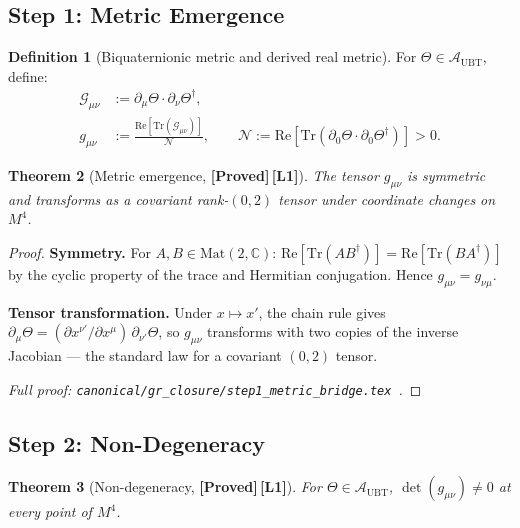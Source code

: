 \documentclass[12pt,a4paper]{article}
\newtheorem{theorem}{Theorem}[section]
\theoremstyle{definition}
\newtheorem{definition}[theorem]{Definition}
\theoremstyle{remark}
\newcommand{\PROVED}{\textbf{[Proved]}}
\newcommand{\Lone}{\textbf{[L1]}}
\newcommand{\CC}{\mathbb{C}}
\newcommand{\Tr}{\mathrm{Tr}}
\newcommand{\re}{\mathrm{Re}}
\newcommand{\calA}{\mathcal{A}}
\newcommand{\calG}{\mathcal{G}}
\newcommand{\calN}{\mathcal{N}}
\begin{document}
\subsection{Step 1: Metric Emergence}
\label{sec:step1}

\begin{definition}[Biquaternionic metric and derived real metric]
\label{def:metric}
For $\Theta \in \calA_{\mathrm{UBT}}$, define:
\begin{align}
  \calG_{\mu\nu} &:= \partial_\mu\Theta \cdot \partial_\nu\Theta^\dagger, \\
  g_{\mu\nu} &:= \frac{\re[\Tr(\calG_{\mu\nu})]}{\calN},
  \qquad
  \calN := \re[\Tr(\partial_0\Theta \cdot \partial_0\Theta^\dagger)] > 0.
\end{align}
\end{definition}

\begin{theorem}[Metric emergence, \PROVED\,\Lone]
\label{thm:metric}
The tensor $g_{\mu\nu}$ is symmetric and transforms as a covariant
rank-$(0,2)$ tensor under coordinate changes on $M^4$.
\end{theorem}

\begin{proof}
\textbf{Symmetry.}
For $A,B \in \mathrm{Mat}(2,\CC)$:
$\re[\Tr(AB^\dagger)] = \re[\Tr(BA^\dagger)]$
by the cyclic property of the trace and Hermitian conjugation.
Hence $g_{\mu\nu} = g_{\nu\mu}$.

\textbf{Tensor transformation.}
Under $x \mapsto x'$, the chain rule gives
$\partial_\mu\Theta = (\partial x^{\nu'}/\partial x^\mu)\,\partial_{\nu'}\Theta$,
so $g_{\mu\nu}$ transforms with two copies of the inverse Jacobian —
the standard law for a covariant $(0,2)$ tensor.

\medskip
\noindent\textit{Full proof:
\texttt{canonical/gr\_closure/step1\_metric\_bridge.tex}~\cite{jaros2026_canonical}.}
\end{proof}

\subsection{Step 2: Non-Degeneracy}
\label{sec:step2}

\begin{theorem}[Non-degeneracy, \PROVED\,\Lone]
\label{thm:nondeg}
For $\Theta \in \calA_{\mathrm{UBT}}$,
$\det(g_{\mu\nu}) \neq 0$ at every point of $M^4$.
\end{theorem}
\end{document}
